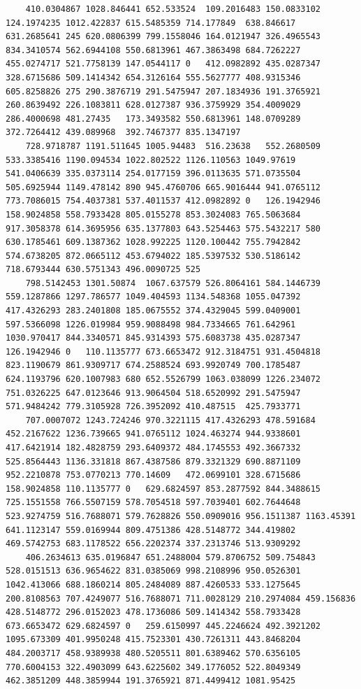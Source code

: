 \documentclass[UTF8]{ctexart}
\begin{document}
\begin{lstlisting}
	410.0304867	1028.846441	652.533524	109.2016483	150.0833102	124.1974235	1012.422837	615.5485359	714.177849	638.846617	631.2685641	245	620.0806399	799.1558046	164.0121947	326.4965543	834.3410574	562.6944108	550.6813961	467.3863498	684.7262227	455.0274717	521.7758139	147.0544117	0	412.0982892	435.0287347	328.6715686	509.1414342	654.3126164	555.5627777	408.9315346	605.8258826	275	290.3876719	291.5475947	207.1834936	191.3765921	260.8639492	226.1083811	628.0127387	936.3759929	354.4009029	286.4000698	481.27435	173.3493582	550.6813961	148.0709289	372.7264412	439.089968	392.7467377	835.1347197
	728.9718787	1191.511645	1005.94483	516.23638	552.2680509	533.3385416	1190.094534	1022.802522	1126.110563	1049.97619	541.0406639	335.0373114	254.0177159	396.0113635	571.0735504	505.6925944	1149.478142	890	945.4760706	665.9016444	941.0765112	773.7086015	754.4037381	537.4011537	412.0982892	0	126.1942946	158.9024858	558.7933428	805.0155278	853.3024083	765.5063684	917.3058378	614.3695956	635.1377803	643.5254463	575.5432217	580	630.1785461	609.1387362	1028.992225	1120.100442	755.7942842	574.6738205	872.0665112	453.6794022	185.5397532	530.5186142	718.6793444	630.5751343	496.0090725	525
	798.5142453	1301.50874	1067.637579	526.8064161	584.1446739	559.1287866	1297.786577	1049.404593	1134.548368	1055.047392	417.4326293	283.2401808	185.0675552	374.4329045	599.0409001	597.5366098	1226.019984	959.9088498	984.7334665	761.642961	1030.970417	844.3340571	845.9314393	575.6083738	435.0287347	126.1942946	0	110.1135777	673.6653472	912.3184751	931.4504818	823.1190679	861.9309717	674.2588524	693.9920749	700.1785487	624.1193796	620.1007983	680	652.5526799	1063.038099	1226.234072	751.0326225	647.0123646	913.9064504	518.6520992	291.5475947	571.9484242	779.3105928	726.3952092	410.487515	425.7933771
	707.0007072	1243.724246	970.3221115	417.4326293	478.591684	452.2167622	1236.739665	941.0765112	1024.463274	944.9338601	417.6421914	182.4828759	293.6409372	484.1745553	492.3667332	525.8564443	1136.331818	867.4387586	879.3321329	690.8871109	952.2210878	753.0770213	770.14609	472.0699101	328.6715686	158.9024858	110.1135777	0	629.6824597	853.2877592	844.3488615	725.1551558	766.5507159	578.7054518	597.7039401	602.7644648	523.9274759	516.7688071	579.7628826	550.0909016	956.1511387	1163.45391	641.1123147	559.0169944	809.4751386	428.5148772	344.419802	469.5742753	683.1178522	656.2202374	337.2313746	513.9309292
	406.2634613	635.0196847	651.2488004	579.8706752	509.754843	528.0151513	636.9654622	831.0385069	998.2108996	950.0526301	1042.413066	688.1860214	805.2484089	887.4260533	533.1275645	200.8108563	707.4249077	516.7688071	711.0028129	210.2974084	459.156836	428.5148772	296.0152023	478.1736086	509.1414342	558.7933428	673.6653472	629.6824597	0	259.6150997	445.2246624	492.3921202	1095.673309	401.9950248	415.7523301	430.7261311	443.8468204	484.2003717	458.9389938	480.5205511	801.6389462	570.6356105	770.6004153	322.4903099	643.6225602	349.1776052	522.8049349	462.3851209	448.3859944	191.3765921	871.4499412	1081.95425

\end{lstlisting}
\end{document}
